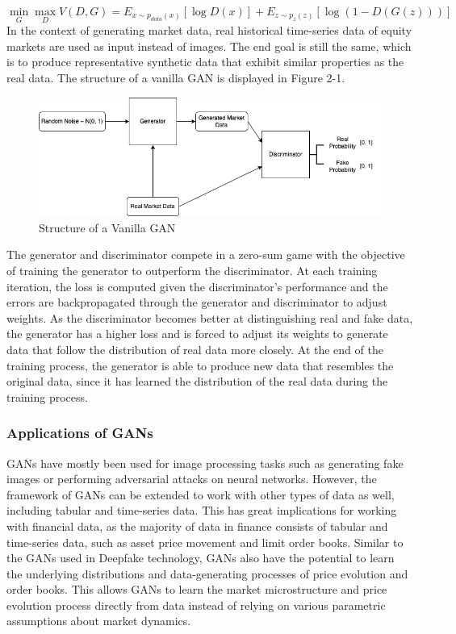 \begin{equation}
    \min_{G}\max_{D}V(D,G) = E_{x\sim p_{data}(x)}[\log{D(x)}]+E_{z\sim p_{z}(z)}[\log(1-D(G(z)))]
\end{equation}
In the context of generating market data, real historical time-series data of equity markets are used as input instead of images. The end goal is still the same, which is to produce representative synthetic data that exhibit similar properties as the real data. The structure of a vanilla GAN is displayed in Figure 2-1.
\begin{figure}[H]
\centering
\includegraphics[width=15cm]{templates/assets/gan/gan_architecture.png}
\caption{Structure of a Vanilla GAN}
\end{figure}
\noindent The generator and discriminator compete in a zero-sum game with the objective of training the generator to outperform the discriminator. At each training iteration, the loss is computed given the discriminator's performance and the errors are backpropagated through the generator and discriminator to adjust weights. As the discriminator becomes better at distinguishing real and fake data, the generator has a higher loss and is forced to adjust its weights to generate data that follow the distribution of real data more closely. At the end of the training process, the generator is able to produce new data that resembles the original data, since it has learned the distribution of the real data during the training process.

\subsubsection{Applications of GANs}
GANs have mostly been used for image processing tasks such as generating fake images or performing adversarial attacks on neural networks. However, the framework of GANs can be extended to work with other types of data as well, including tabular and time-series data. This has great implications for working with financial data, as the majority of data in finance consists of tabular and time-series data, such as asset price movement and limit order books. Similar to the GANs used in Deepfake technology, GANs also have the potential to learn the underlying distributions and data-generating processes of price evolution and order books. This allows GANs to learn the market microstructure and price evolution process directly from data instead of relying on various parametric assumptions about market dynamics.

